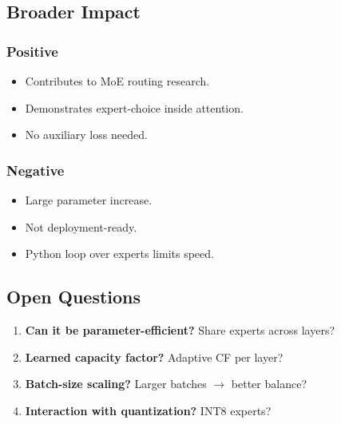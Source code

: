 \subsection{Broader Impact}

\subsubsection{Positive}
\begin{itemize}
\item Contributes to MoE routing research.
\item Demonstrates expert-choice inside attention.
\item No auxiliary loss needed.

\end{itemize}
\subsubsection{Negative}
\begin{itemize}
\item Large parameter increase.
\item Not deployment-ready.
\item Python loop over experts limits speed.

\end{itemize}
\subsection{Open Questions}

\begin{enumerate}
\item \textbf{Can it be parameter-efficient?} Share experts across layers?
\item \textbf{Learned capacity factor?} Adaptive CF per layer?
\item \textbf{Batch-size scaling?} Larger batches $\to$ better balance?
\item \textbf{Interaction with quantization?} INT8 experts?

\end{enumerate}
